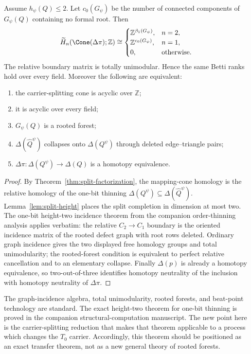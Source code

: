 \begin{theorem}
\label{thm:carrier-graph}
Assume $h_\psi(Q)\leq2$.  Let $c_0(G_\psi)$ be the number of connected components
of $G_\psi(Q)$ containing no formal root.  Then
\[
 \widetilde H_n\!\left(\Cone(\Delta\pi);\mathbb Z\right)
 \cong
 \begin{cases}
   \mathbb Z^{\beta_1(G_\psi)},&n=2,\\
   \mathbb Z^{c_0(G_\psi)},&n=1,\\
   0,&\text{otherwise}.
 \end{cases}
\]
The relative boundary matrix is totally unimodular.  Hence the same Betti ranks hold
over every field.  Moreover the following are equivalent:
\begin{enumerate}[label=(\roman*)]
\item the carrier-splitting cone is acyclic over $\mathbb Z$;
\item it is acyclic over every field;
\item $G_\psi(Q)$ is a rooted forest;
\item $\Delta(\widehat Q^\psi)$ collapses onto $\Delta(Q^\psi)$ through deleted
edge--triangle pairs;
\item $\Delta\pi:\Delta(Q^\psi)\to\Delta(Q)$ is a homotopy equivalence.
\end{enumerate}
\end{theorem}

\begin{proof}
By Theorem~\ref{thm:split-factorization}, the mapping-cone homology is the relative
homology of the one-bit thinning
$\Delta(Q^\psi)\subseteq\Delta(\widehat Q^\psi)$.  Lemma~\ref{lem:split-height}
places the split completion in dimension at most two.  The one-bit height-two
incidence theorem from the companion order-thinning analysis applies verbatim: the
relative $C_2\to C_1$ boundary is the oriented incidence matrix of the rooted defect
graph with root rows deleted.  Ordinary graph incidence gives the two displayed free
homology groups and total unimodularity; the rooted-forest condition is equivalent to
perfect relative cancellation and to an elementary collapse.  Finally
$\Delta(p)$ is already a homotopy equivalence, so two-out-of-three identifies
homotopy neutrality of the inclusion with homotopy neutrality of $\Delta\pi$.
\end{proof}

\begin{remark}
The graph-incidence algebra, total unimodularity, rooted forests, and beat-point
technology are standard.  The exact height-two theorem for one-bit thinning is proved
in the companion structural-computation manuscript.  The new point here is the
carrier-splitting reduction that makes that theorem applicable to a process which
changes the $T_0$ carrier.  Accordingly, this theorem should be positioned as an
exact transfer theorem, not as a new general theory of rooted forests.
\end{remark}

